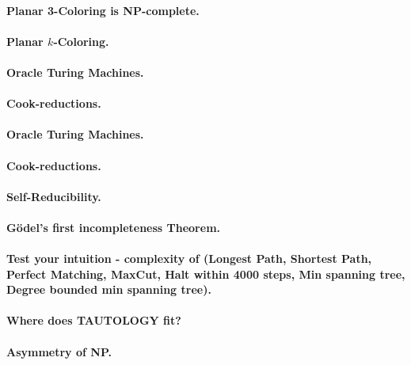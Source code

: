 \documentclass[11pt,a4paper]{article}
\theoremstyle{definition}
\begin{document}
\paragraph{Planar 3-Coloring is NP-complete.}

\paragraph{Planar $k$-Coloring.}

\paragraph{Oracle Turing Machines.}

\paragraph{Cook-reductions.}

\paragraph{Oracle Turing Machines.}

\paragraph{Cook-reductions.}

\paragraph{Self-Reducibility.}

\paragraph{Gödel's first incompleteness Theorem.}

\paragraph{Test your intuition - complexity of (Longest Path, Shortest Path, Perfect Matching, MaxCut, Halt within 4000 steps, Min spanning tree, Degree bounded min spanning tree).}

\paragraph{Where does TAUTOLOGY fit?}

\paragraph{Asymmetry of NP.}
\end{document}
